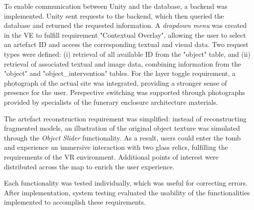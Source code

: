 To enable communication between Unity and the database, a backend was implemented. Unity sent requests to the backend, which then queried the database and returned the requested information. 
A \emph{dropdown menu} was created in the \gls{VE} to fulfill requirement "Contextual Overlay", allowing the user to select an artefact ID and access the corresponding textual and visual data. 
Two request types were defined: (i) retrieval of all available ID from the "object" table, and (ii) retrieval of associated textual and image data, combining information from the "object" and "object\_intervention" tables.
For the layer toggle requirement, a photograph of the actual site was integrated, providing a stronger sense of presence for the user. Perspective switching was supported through photographs provided by specialists of the funerary enclosure architecture materials. 

The artefact reconstruction requirement was simplified: instead of reconstructing fragmented models, an illustration of the original object texture was simulated through the \emph{Object Slider} functionality.
As a result, users could enter the tomb and experience an immersive interaction with two glass relics, fulfilling the requirements of the \gls{VR} environment. Additional points of interest were distributed across the map to enrich the user experience.

Each functionality was tested individually, which was useful for correcting errors. After implementation, system testing evaluated the usability of the functionalities implemented to accomplish these requirements.







